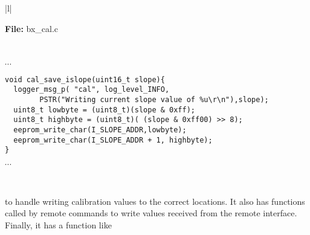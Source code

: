 \begin{center}
  \vspace{-\baselineskip}
  \begin{tabular}{|l|} \hline
    \begin{minipage}[c]{\textwidth - 2\tabcolsep}
      \textbf{File:}
      bx\_cal.c
    \end{minipage}\\
    \begin{minipage}[c]{\textwidth - 2\tabcolsep}
      \vspace{0.5\baselineskip}
      $\cdots$ \\
      \begin{minipage}[c]{\textwidth - 2\tabcolsep}
        \lstset{language=c}
        \begin{lstlisting}
void cal_save_islope(uint16_t slope){
  logger_msg_p( "cal", log_level_INFO,
		PSTR("Writing current slope value of %u\r\n"),slope);
  uint8_t lowbyte = (uint8_t)(slope & 0xff);
  uint8_t highbyte = (uint8_t)( (slope & 0xff00) >> 8);
  eeprom_write_char(I_SLOPE_ADDR,lowbyte);
  eeprom_write_char(I_SLOPE_ADDR + 1, highbyte);
}
        \end{lstlisting}
      \end{minipage}
      $\cdots$\\
      \vspace{-0.5\baselineskip}
    \end{minipage}\\
    \hline
  \end{tabular}
\end{center}
to handle writing calibration values to the correct locations.  It
also has functions called by remote commands to write values received
from the remote interface.  Finally, it has a function like
